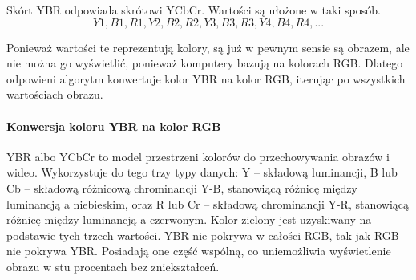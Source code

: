 Skórt YBR odpowiada skrótowi YCbCr.
Wartości są ułożone w taki sposób.
\[Y1, B1, R1, Y2, B2, R2, Y3, B3, R3, Y4, B4, R4,  ...\]

Ponieważ wartości te reprezentują kolory, są już w pewnym sensie są obrazem, ale nie można go wyświetlić, ponieważ komputery bazują na kolorach RGB.
Dlatego odpowieni algorytm konwertuje kolor YBR na kolor RGB, iterując po wszystkich wartościach obrazu.

\paragraph{Konwersja koloru YBR na kolor RGB}

YBR albo YCbCr to model przestrzeni kolorów do przechowywania obrazów i wideo.
Wykorzystuje do tego trzy typy danych: Y – składową luminancji, B lub Cb – składową różnicową chrominancji Y-B, stanowiącą różnicę między luminancją a niebieskim, oraz R lub Cr – składową chrominancji Y-R, stanowiącą różnicę między luminancją a czerwonym.
Kolor zielony jest uzyskiwany na podstawie tych trzech wartości.
YBR nie pokrywa w całości RGB, tak jak RGB nie pokrywa YBR.
Posiadają one część wspólną, co uniemożliwia wyświetlenie obrazu w stu procentach bez zniekształceń.
